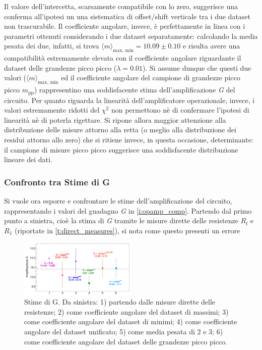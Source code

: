 \documentclass[a4paper,11pt]{article} %
\begin{document}
\noindent  Il valore dell'intercetta, scarsamente compatibile con lo zero, suggerisce una conferma all'ipotesi un una
sistematica di offset/shift verticale tra i due dataset non trascurabile. Il coefficiente angolare, invece, è
perfettamente in linea con i parametri ottenuti considerando i due dataset separatamente: calcolando la media pesata dei
due, infatti, si trova $\langle m\rangle_{\text{max, min}}=10.09 \pm 0.10$ e risulta avere una compatibilità
estremamente elevata con il coefficiente angolare riguardante il dataset delle grandezze picco picco ($\lambda = 0.01$).
Si assume dunque che questi due valori ($\langle m\rangle_{\text{max, min}}$ ed il coefficiente angolare del campione di
grandezze picco picco $m_{\text{pp}}$) rappresentino una soddisfacente stima dell'amplificazione \textit{G} del
circuito. Per quanto riguarda la linearità dell'amplificatore operazionale, invece, i valori estremamente ridotti del
$\chi^2$ non permettono nè di confermare l'ipotesi di linearità nè di poterla rigettare. Si ripone allora maggior
attenzione alla distribuzione delle misure attorno alla retta (o meglio alla distribuzione dei residui attorno allo
zero) che si ritiene invece, in questa occasione, determinante: il campione di misure picco picco suggerisce una
soddisfacente distribuzione lineare dei dati. 



\subsubsection{Confronto tra Stime di G}
 Si vuole ora esporre e confrontare le stime dell'amplificazione del circuito, rappresentando i valori del guadagno
\textit{G} in \autoref{i:opamp_comp}. Partendo dal primo punto a sinistra, cioè la stima di \textit{G} tramite le misure
dirette delle resistenze $R_{\text{f}}$ e $R_{1}$ (riportate in \autoref{t:direct_measures}), si nota come questo
presenti un errore 

\begin{figure}
	\centering
	\includegraphics[width=0.5\textwidth]{../Plots/Report_Plots/opamp_comp_BIG.png}
	\caption{\footnotesize Stime di G. Da sinistra: 1) partendo dalle misure dirette delle resistenze; 2) come
	coefficiente angolare del dataset di massimi; 3) come coefficiente angolare del dataset di minimi; 4) come
	coefficiente angolare del dataset unificato; 5) come media pesata di 2 e 3; 6) come coefficiente angolare del
	dataset delle grandezze picco picco.}
	\label{i:opamp_comp}
\end{figure}
\end{document}
